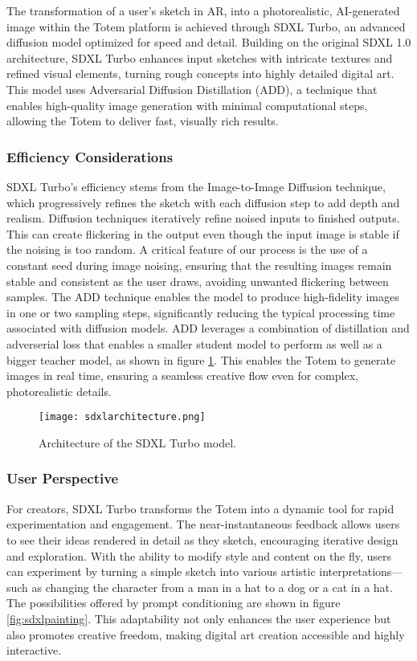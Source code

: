 The transformation of a user’s sketch in AR, into a photorealistic, AI-generated image within the Totem platform is achieved through SDXL Turbo\cite{sauer2023adversarial}, an advanced diffusion model optimized for speed and detail.
Building on the original SDXL 1.0 architecture, SDXL Turbo enhances input sketches with intricate textures and refined visual elements, turning rough concepts into highly detailed digital art.
This model uses Adversarial Diffusion Distillation (ADD), a technique that enables high-quality image generation with minimal computational steps, allowing the Totem to deliver fast, visually rich results.

\subsubsection{Efficiency Considerations}
SDXL Turbo’s efficiency stems from the Image-to-Image Diffusion technique, which progressively refines the sketch with each diffusion step to add depth and realism.
Diffusion techniques iteratively refine noised inputs to finished outputs. This can create flickering in the output even though the input image is stable if the noising is too random.
A critical feature of our process is the use of a constant seed during image noising, ensuring that the resulting images remain stable and consistent as the user draws, avoiding unwanted flickering between samples.
The ADD technique enables the model to produce high-fidelity images in one or two sampling steps, significantly reducing the typical processing time associated with diffusion models.
ADD leverages a combination of distillation and adverserial loss that enables a smaller student model to perform as well as a bigger teacher model, as shown in figure \ref{fig:sdxlarchitecture}.
This enables the Totem to generate images in real time, ensuring a seamless creative flow even for complex, photorealistic details.

\begin{figure}[!h]
    \centering
    \texttt{[image: sdxlarchitecture.png]}
    \caption{Architecture of the SDXL Turbo model.}
    \vspace{0.1cm}
    \label{fig:sdxlarchitecture}
\end{figure}

\subsubsection{User Perspective}
For creators, SDXL Turbo transforms the Totem into a dynamic tool for rapid experimentation and engagement.
The near-instantaneous feedback allows users to see their ideas rendered in detail as they sketch, encouraging iterative design and exploration.
With the ability to modify style and content on the fly, users can experiment by turning a simple sketch into various artistic interpretations—such as changing the character from a man in a hat to a dog or a cat in a hat.
The possibilities offered by prompt conditioning are shown in figure \ref{fig:sdxlpainting}.
This adaptability not only enhances the user experience but also promotes creative freedom, making digital art creation accessible and highly interactive.

